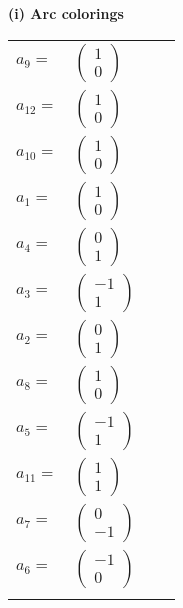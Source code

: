 \documentclass[1p]{elsarticle_modified}
\theoremstyle{definition}
\begin{document}
\flushleft \textbf{(i) Arc colorings}\\
\begin{tabular}{m{7pt} m{180pt} m{7pt} m{180pt} }
\flushright $a_{9}=$&$\begin{pmatrix}1\\0\end{pmatrix}$ \\
\flushright $a_{12}=$&$\begin{pmatrix}1\\0\end{pmatrix}$ \\
\flushright $a_{10}=$&$\begin{pmatrix}1\\0\end{pmatrix}$ \\
\flushright $a_{1}=$&$\begin{pmatrix}1\\0\end{pmatrix}$ \\
\flushright $a_{4}=$&$\begin{pmatrix}0\\1\end{pmatrix}$ \\
\flushright $a_{3}=$&$\begin{pmatrix}-1\\1\end{pmatrix}$ \\
\flushright $a_{2}=$&$\begin{pmatrix}0\\1\end{pmatrix}$ \\
\flushright $a_{8}=$&$\begin{pmatrix}1\\0\end{pmatrix}$ \\
\flushright $a_{5}=$&$\begin{pmatrix}-1\\1\end{pmatrix}$ \\
\flushright $a_{11}=$&$\begin{pmatrix}1\\1\end{pmatrix}$ \\
\flushright $a_{7}=$&$\begin{pmatrix}0\\-1\end{pmatrix}$ \\
\flushright $a_{6}=$&$\begin{pmatrix}-1\\0\end{pmatrix}$\\&\end{tabular}
\end{document}
